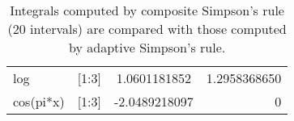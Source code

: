 \begin{table}[H]
\begin{tabular}{lccr}
        
        \\
    
        
            log
             
               &
            
        
            [1:3]
             
               &
            
        
            1.0601181852
             
               &
            
        
            1.2958368650
            
        
        \\
    
        
            cos(pi*x)
             
               &
            
        
            [1:3]
             
               &
            
        
            -2.0489218097
             
               &
            
        
            0
            
        
        \\
    
    \hline
    \end{tabular}
    \caption{Integrals computed by composite Simpson's rule (20 intervals) are compared with those computed by adaptive Simpson's 	
    rule.}
    \label{tab:ASQvsCSQ}
\end{table}

